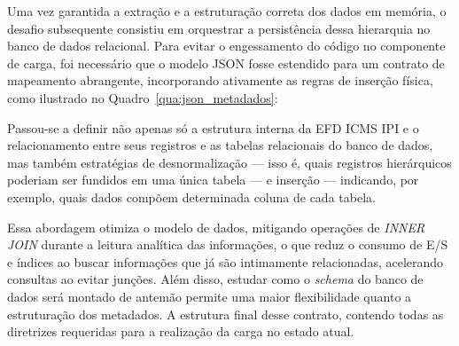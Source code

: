 Uma vez garantida a extração e a estruturação correta dos dados em memória, o
desafio subsequente consistiu em orquestrar a persistência dessa hierarquia no
banco de dados relacional. Para evitar o engessamento do código no componente
de carga, foi necessário que o modelo JSON fosse estendido para um contrato de
mapeamento abrangente, incorporando ativamente as regras de inserção física, como ilustrado no Quadro~\ref{qua:json_metadados}:







Passou-se a definir não apenas só a estrutura interna da EFD ICMS IPI e o
relacionamento entre seus registros e as tabelas relacionais do
banco de dados, mas também estratégias de desnormalização --- isso é, quais
registros hierárquicos poderiam ser fundidos em uma única tabela
--- e inserção --- indicando, por exemplo, quais dados compõem determinada
coluna de cada tabela.

Essa abordagem otimiza o modelo de dados, mitigando
operações de \textit{INNER JOIN} durante a leitura analítica das
informações, o que reduz o consumo de E/S e índices ao buscar informações que
já são intimamente relacionadas, acelerando consultas ao evitar junções. Além
disso, estudar como o \textit{schema} do banco de dados será montado de antemão
permite uma maior flexibilidade quanto a estruturação dos metadados. A
estrutura final desse contrato, contendo todas as diretrizes requeridas para
a realização da carga no estado atual.

